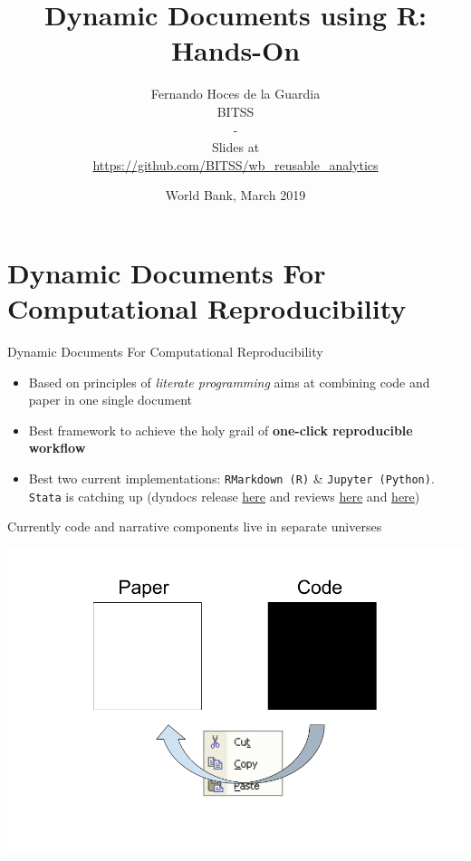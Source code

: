 \documentclass[ignorenonframetext,]{beamer}
\title{Dynamic Documents using R: Hands-On}
\author{Fernando Hoces de la Guardia\\
BITSS\\
-\\
Slides at\\
\hspace*{0.333em}\url{https://github.com/BITSS/wb_reusable_analytics}}
\date{World Bank, March 2019}
\providecommand{\tightlist}{%
  \setlength{\itemsep}{0pt}\setlength{\parskip}{0pt}}
\begin{document}
\frame{\titlepage}

\begin{frame}
\tableofcontents[hideallsubsections]
\end{frame}
\hypertarget{dynamic-documents-for-computational-reproducibility}{%
\section{Dynamic Documents For Computational
Reproducibility}\label{dynamic-documents-for-computational-reproducibility}}

\begin{frame}[fragile]{Dynamic Documents For Computational
Reproducibility}
\protect\hypertarget{dynamic-documents-for-computational-reproducibility-1}{}

\begin{itemize}
\tightlist
\item
  Based on principles of \emph{literate programming} aims at combining
  code and paper in one single document
\item
  Best framework to achieve the holy grail of \textbf{one-click
  reproducible workflow}
\item
  Best two current implementations: \texttt{RMarkdown\ (R)} \&
  \texttt{Jupyter\ (Python)}. \texttt{Stata} is catching up (dyndocs
  release \href{https://www.stata.com/new-in-stata/markdown/}{here} and
  reviews
  \href{http://data.princeton.edu/stata/markdown/markstat.htm}{here} and
  \href{https://www.bitss.org/2017/09/05/review-of-statas-dyndoc/}{here})
\end{itemize}

\end{frame}

\begin{frame}{Currently code and narrative components live in separate
universes}
\protect\hypertarget{currently-code-and-narrative-components-live-in-separate-universes}{}

\includegraphics{../Images/Two universes.png}

\end{frame}
\end{document}
